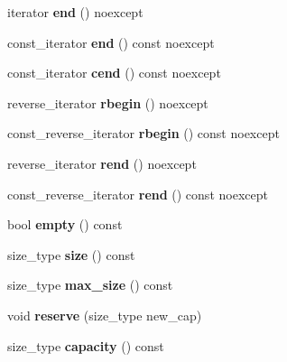 \begin{DoxyCompactItemize}
\item 
\mbox{\label{classvector_a1c10e9a92cba48b9ce7e5ef57f5c563f}} 
iterator {\bfseries end} () noexcept
\item 
\mbox{\label{classvector_a171aa8a8a90593d6c27050efbd010217}} 
const\+\_\+iterator {\bfseries end} () const noexcept
\item 
\mbox{\label{classvector_a41df7e1b671b54e1cc811b90e3cf69a0}} 
const\+\_\+iterator {\bfseries cend} () const noexcept
\item 
\mbox{\label{classvector_a0f00e006d9b22319d3ca91f3df6ab0e3}} 
reverse\+\_\+iterator {\bfseries rbegin} () noexcept
\item 
\mbox{\label{classvector_abff8297bbee791ee92504d88f30b3658}} 
const\+\_\+reverse\+\_\+iterator {\bfseries rbegin} () const noexcept
\item 
\mbox{\label{classvector_ae12fc54b8c282ec417034a00b0091c27}} 
reverse\+\_\+iterator {\bfseries rend} () noexcept
\item 
\mbox{\label{classvector_a92f8a87584ca90a5d26e88e273e13017}} 
const\+\_\+reverse\+\_\+iterator {\bfseries rend} () const noexcept
\item 
\mbox{\label{classvector_a5c293a40acc63767d64a1cffcf7ce890}} 
bool {\bfseries empty} () const
\item 
\mbox{\label{classvector_ae313a69eee41240bfe37048fc2fbe690}} 
size\+\_\+type {\bfseries size} () const
\item 
\mbox{\label{classvector_a2ad979f6c8a5012e1562c37646d604fd}} 
size\+\_\+type {\bfseries max\+\_\+size} () const
\item 
\mbox{\label{classvector_a018ba0b5d6c1485841fd066f870139fe}} 
void {\bfseries reserve} (size\+\_\+type new\+\_\+cap)
\item 
\mbox{\label{classvector_a9f6f586e4bb6c71571fb0cd3fa2ed3f8}} 
size\+\_\+type {\bfseries capacity} () const

\end{DoxyCompactItemize}
